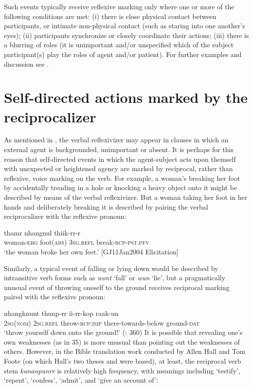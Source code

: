 \documentclass[output=paper]{langscibook}
\begin{document}
Such events typically receive reflexive marking only where one or more of the following conditions are met: (i) there is close physical contact between participants, or intimate non-physical contact (such as staring into one another’s eyes); (ii) participants synchronize or closely coordinate their actions; (iii) there is a blurring of roles (it is unimportant and/or unspecified which of the subject participant(s) play the roles of agent and/or patient). For further examples and discussion see \citet{Gaby2011}. 

\section{Self-directed actions marked by the reciprocalizer}\label{sec:Gaby:5}
As mentioned in , the verbal reflexivizer may appear in clauses in which an external agent is backgrounded, unimportant or absent. It is perhaps for this reason that self-directed events in which the agent-subject acts upon themself with unexpected or heightened agency are marked by reciprocal, rather than reflexive, voice marking on the verb. For example, a woman’s breaking her foot by accidentally treading in a hole or knocking a heavy object onto it might be described by means of the verbal reflexivizer. But a woman taking her foot in her hands and deliberately breaking it is described by pairing the verbal reciprocalizer with the reflexive pronoun:

 \ea 
    \label{ex:Gaby:33}
      {thamr}  {nhangnul}  {thiik-rr-r} \\
woman\textsc{-erg}  foot(\textsc{abs)}  \textsc{3sg}.\textsc{refl}  break-\textsc{rcp-pst.pfv}\\
    \glt ‘the woman broke her own feet.’ [GJ11Jan2004 Elicitation]
    \z
 
Similarly, a typical event of falling or lying down would be described by intransitive verb forms such as \textit{wont} ‘fall’ or \textit{wun} ‘lie’, but a pragmatically unusual event of throwing oneself to the ground receives reciprocal marking paired with the reflexive pronoun:

\ea 
    \label{ex:Gaby:34}
      {nhangknunt}  {thunp-rr}  {ii-rr-kop}  {raak-un}\\
     \textsc{2sg}(\textsc{nom})  \textsc{2sg}.\textsc{refl}  throw-\textsc{rcp:imp}  there-towards-below  ground-\textsc{dat}\\
    \glt ‘throw yourself down onto the ground!’ (\citealt{FooteHall1992}: 360)
    \z
It is possible that revealing one’s own weaknesses (as in 35) is more unusual than pointing out the weaknesses of others. However, in the Bible translation work conducted by Allen Hall and Tom Foote (on which Hall’s two theses and \citealt{FooteHall1992} were based), at least, the reciprocal verb stem \textit{kunanpunrr} is relatively high frequency, with meanings including ‘testify’, ‘repent’, ‘confess’, ‘admit’, and ‘give an account of’:
\end{document}
